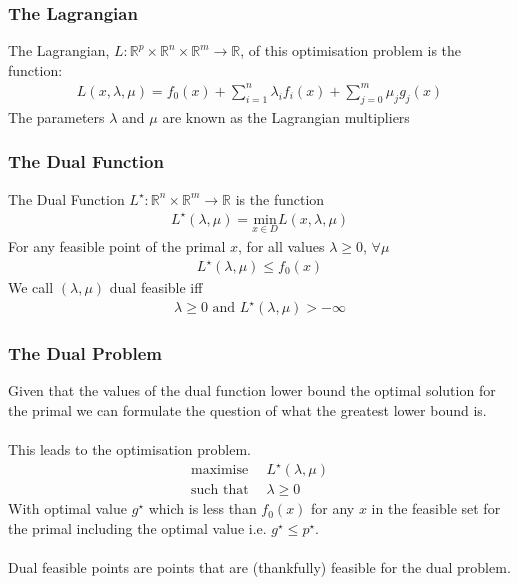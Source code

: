 \documentclass{beamer}
\def\rnum{\mathbb{R}}
\begin{document}
\begin{frame}
    \frametitle{The Lagrangian}
    The Lagrangian, $L : \rnum^{p} \times \rnum^{n} \times \rnum^{m} \rightarrow
    \rnum$, of this optimisation problem is the function:
    \begin{align*}
        L(x, \lambda, \mu) = f_{0}(x) + \sum\limits_{i=1}^{n}\lambda_{i} f_{i}(x) +
        \sum\limits_{j=0}^{m}\mu_{j}g_{j}(x)
    \end{align*}
    The parameters $\lambda$ and $\mu$ are known as the Lagrangian multipliers
\end{frame}

\begin{frame}
    \frametitle{The Dual Function}
    The Dual Function $L^{\star}: \rnum^{n}\times\rnum^{m} \rightarrow \rnum$ is
    the function
    \begin{align*}
        L^{\star}(\lambda, \mu) = \underset{x \in D}{\text{min}}L(x, \lambda, \mu)
    \end{align*}
    For any feasible point of the primal $x$, for all values
    $\lambda \geq 0$, $\forall \mu$
    \begin{align*}
        L^{\star}(\lambda, \mu) \leq f_{0}(x)
    \end{align*}
    We call $(\lambda, \mu)$ dual feasible iff
    \begin{align*}
        \lambda \geq 0 \text{ and } L^{\star}(\lambda, \mu) > -\infty
    \end{align*}
\end{frame}

\begin{frame}
    \frametitle{The Dual Problem}
    Given that the values of the dual function lower bound the optimal solution
    for the primal we can formulate the question of what the greatest lower
    bound is.
    \\~\\
    This leads to the optimisation problem.
    {\footnotesize
    \begin{align*}
        \text{maximise } \, &L^{\star}(\lambda, \mu)\\
        \text{such that } &\lambda \geq 0
    \end{align*}}
    \hspace{-1mm}With optimal value $g^{\star}$ which is less than $f_{0}(x)$ for any
    $x$ in the feasible set for the primal including the optimal value i.e.
    $g^{\star} \leq p^{\star}$.
    \\~\\
    Dual feasible points are points that are (thankfully) feasible for the dual
    problem.

\end{frame}
\end{document}
